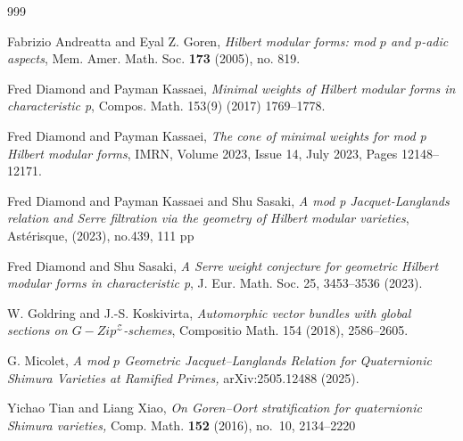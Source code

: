 \documentclass[11pt,pdflatex]{amsart}
\theoremstyle{plain}
\theoremstyle{definition}
\theoremstyle{plain}
\theoremstyle{definition}
\theoremstyle{remark}
\numberwithin{equation}{section}
\numberwithin{figure}{section} \numberwithin{table}{subsection}
\newcommand{\calZ}{{\mathcal{Z}}}
\begin{document}
 
\begin{thebibliography}{999}


 Fabrizio Andreatta and Eyal Z. Goren, \textit{Hilbert modular forms: mod $p$
and $p$-adic aspects}, Mem. Amer. Math. Soc. {\bf 173} (2005), no. 819.

 Fred Diamond and Payman Kassaei, \textit{Minimal weights of Hilbert modular forms in characteristic p}, Compos. Math. 153(9) (2017) 1769–1778.

 
 Fred Diamond and Payman Kassaei, \textit{The cone of minimal weights for mod p Hilbert modular forms}, IMRN, Volume 2023, Issue 14, July 2023, Pages 12148–12171.

 Fred Diamond and Payman Kassaei and Shu Sasaki, \textit{A mod p Jacquet-Langlands relation and Serre filtration via the geometry of Hilbert modular varieties}, Ast\'erisque, (2023), no.439, 111 pp

 Fred Diamond and  Shu Sasaki, \textit{A Serre weight conjecture for geometric Hilbert modular forms in characteristic p},  J. Eur. Math. Soc. 25, 3453–3536 (2023).

 

 

 W. Goldring and J.-S. Koskivirta, \textit{Automorphic vector bundles with global sections on $G-Zip^\calZ$-schemes}, Compositio Math. 154 (2018), 2586–2605.

 
 

 G. Micolet, \textit{A mod $p$ Geometric Jacquet--Langlands Relation
for Quaternionic Shimura Varieties at Ramified
Primes,} arXiv:2505.12488  (2025).


  Yichao Tian and Liang Xiao, \textit{On Goren--Oort stratification for quaternionic
Shimura varieties,} Comp. Math. {\bf 152} (2016), no.~10, 2134--2220

\end{thebibliography}
\end{document}

